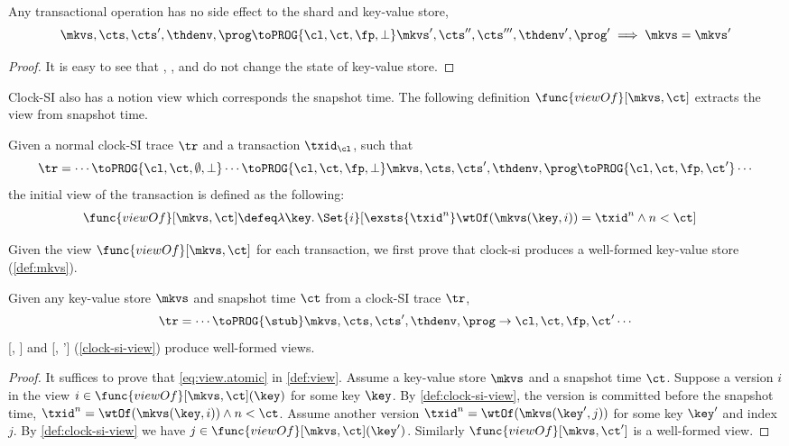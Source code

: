 \begin{lemma}
    \label{lem:no-side-effect-local-operation}
    Any transactional operation has no side effect to the shard and key-value store,
    \[
        \mkvs, \cts, \cts', \thdenv, \prog \toPROG{\cl, \ct, \fp, \perp} \mkvs', \cts'', \cts''', \thdenv', \prog' \implies \mkvs = \mkvs'
    \]
\end{lemma}
\begin{proof}
    It is easy to see that 
    , ,  and  do not change the state of key-value store.
\end{proof}

Clock-SI also has a notion view which corresponds the snapshot time.
The following definition \( \func{viewOf}[\mkvs,\ct] \) extracts the view from snapshot time.
\begin{definition}
    \label{clock-si-view}
    \label{def:clock-si-view}
    Given a normal clock-SI trace \( \tr \) and a transaction \( \txid_\cl \), such that
    \[
        \tr = \cdots \toPROG{\cl, \ct, \emptyset, \perp} \cdots \toPROG{\cl, \ct, \fp, \perp} \mkvs, \cts, \cts', \thdenv, \prog  \toPROG{\cl, \ct, \fp, \ct'} \cdots
    \] 
    the initial view of the transaction is defined as the following:
    \begin{align*}
        \func{viewOf}[\mkvs,\ct] & \defeq \lambda \key \ldotp \Set{i}[\exsts{\txid^{n} } \wtOf(\mkvs(\key,i)) = \txid^{n} \land n < \ct]
    \end{align*}
\end{definition}

Given the view \( \func{viewOf}[\mkvs,\ct] \) for each transaction, 
we first prove that clock-si produces a well-formed key-value store (\cref{def:mkvs}).
\begin{lemma}
    \label{lem:well-formed-clock-si-view}
    Given any key-value store \( \mkvs \) and snapshot time \( \ct \) from a clock-SI trace \( \tr \),
    \[
        \tr = \cdots \toPROG{\stub} \mkvs, \cts, \cts', \thdenv, \prog \to{\cl, \ct, \fp, \ct'} \cdots
    \]
    [\mkvs, \ct] and [\mkvs, \ct'] (\cref{clock-si-view}) produce well-formed views.
\end{lemma}
\begin{proof}                     
    It suffices to prove that \cref{eq:view.atomic} in \cref{def:view}.
    Assume a key-value store \( \mkvs \) and a snapshot time \( \ct \).
    Suppose a version \( i \) in the view \( i \in \func{viewOf}[\mkvs,\ct](\key)\) for some key \( \key \).
    By \cref{def:clock-si-view}, the version is committed before the snapshot time,
    \ie \( \txid^n = \wtOf(\mkvs(\key, i)) \land n < \ct\).
    Assume another version \( \txid^n = \wtOf(\mkvs(\key', j)) \) for some key \( \key' \) and index \( j \).
    By \cref{def:clock-si-view} we have \( j \in \func{viewOf}[\mkvs,\ct](\key') \).
    Similarly \( \func{viewOf}[\mkvs, \ct'] \) is a well-formed view.
\end{proof}

